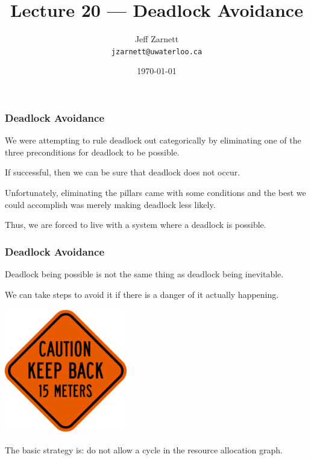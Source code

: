 

\title{Lecture 20 --- Deadlock Avoidance }

\author{Jeff Zarnett \\ \small \texttt{jzarnett@uwaterloo.ca}}
\date{\today}




\begin{frame}
	\titlepage

\end{frame}

\begin{frame}
	\frametitle{Deadlock Avoidance}

	We were attempting to rule deadlock out categorically by eliminating one of the three preconditions for deadlock to be possible.

	If successful, then we can be sure that deadlock does not occur.

	Unfortunately, eliminating the pillars came with some conditions and the best we could accomplish was merely making deadlock less likely.

	Thus, we are forced to live with a system where a deadlock is possible.
\end{frame}


\begin{frame}
	\frametitle{Deadlock Avoidance}

	Deadlock being possible is not the same thing as deadlock being inevitable.

	We can take steps to avoid it if there is a danger of it actually happening.

	\begin{center}
		\includegraphics[width=0.4\textwidth]{images/keepback.png}
	\end{center}

	The basic strategy is: do not allow a cycle in the resource allocation graph.


\end{frame}

